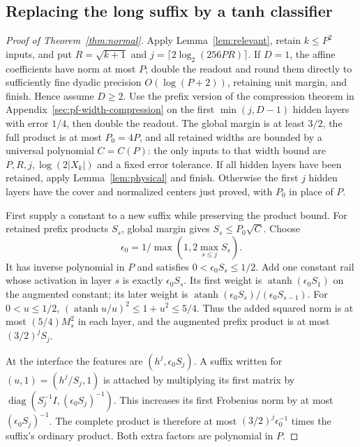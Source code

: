 \subsection{Replacing the long suffix by a tanh classifier}

\begin{proof}[Proof of Theorem~\ref{thm:normal}]
Apply Lemma~\ref{lem:relevant}, retain $k\le P^2$ inputs, and
put $R=\sqrt{k+1}$ and
$j=\lceil2\log_2(256PR)\rceil$.
If $D=1$, the affine coefficients have norm at most $P$; double
the readout and round them directly to sufficiently fine dyadic
precision $O(\log(P+2))$, retaining unit margin, and finish.
Hence assume $D\ge2$.
Use the prefix version of the compression theorem in
Appendix~\ref{sec:pf-width-compression} on the first
$\min(j,D-1)$ hidden layers with error $1/4$, then double the
readout. The global margin is at least $3/2$, the full product is
at most $P_0=4P$, and all retained widths are bounded by a
universal polynomial $C=C(P)$: the only inputs to that width
bound are $P,R,j,\log(2|X_k|)$ and a fixed error tolerance.
If all hidden layers have been retained, apply
Lemma~\ref{lem:physical} and finish. Otherwise the first $j$
hidden layers have the cover and normalized centers just proved,
with $P_0$ in place of $P$.

First supply a constant to a new suffix while preserving the product
bound. For retained prefix products $S_s$, global margin gives
$S_s\le P_0\sqrt C$. Choose
\[
 \epsilon_0=1/\max(1,2\max_{s\le j}S_s).
\]
It has inverse polynomial in $P$ and satisfies
$0<\epsilon_0S_s\le1/2$. Add one constant rail whose activation
in layer $s$ is exactly $\epsilon_0S_s$. Its first weight is
$\operatorname{atanh}(\epsilon_0S_1)$ on the augmented constant;
its later weight is
$\operatorname{atanh}(\epsilon_0S_s)/(\epsilon_0S_{s-1})$.
For $0<u\le1/2$,
$(\operatorname{atanh}u/u)^2\le1+u^2\le5/4$.
Thus the added squared norm is at most $(5/4)M_s^2$ in each
layer, and the augmented prefix product is at most $(3/2)^jS_j$.

At the interface the features are $(h^j,\epsilon_0S_j)$.
A suffix written for $(u,1)=(h^j/S_j,1)$ is attached by multiplying
its first matrix by
$\operatorname{diag}(S_j^{-1}I,(\epsilon_0S_j)^{-1})$.
This increases its first Frobenius norm by at most
$(\epsilon_0S_j)^{-1}$. The complete product is therefore at
most $(3/2)^j\epsilon_0^{-1}$ times the suffix's ordinary product.
Both extra factors are polynomial in $P$.


\end{proof}
